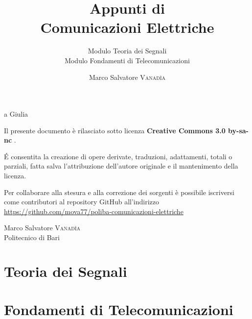 \documentclass[10pt,a4paper,onecolumn,titlepage,twoside,openright,final]{book}
\title{Appunti di \\ Comunicazioni Elettriche}
\subtitle{Modulo Teoria dei Segnali\\Modulo Fondamenti di Telecomunicazioni}
\author{Marco Salvatore \textsc{Vanad\`{i}a}}
\begin{document}
\frontmatter
\maketitle
\newpage

\null{} 
\begin{flushright}a Giulia\end{flushright}
\null
\vfill
Il presente documento è rilasciato sotto licenza \ccLogo \textbf{Creative Commons 3.0 by-sa-nc} \ccbyncsa. 

\'{E} consentita la creazione di opere derivate, traduzioni, adattamenti, totali o parziali, fatta salva l'attribuzione dell'autore originale e il mantenimento della licenza. 

Per collaborare alla stesura e alla correzione dei sorgenti è possibile iscriversi come contributori al repository GitHub all'indirizzo \url{https://github.com/mova77/poliba-comunicazioni-elettriche}

Marco Salvatore \textsc{Vanadìa}\\Politecnico di Bari
\cleardoublepage\clearpage{\pagestyle{empty}\cleardoublepage}

\tableofcontents

\mainmatter
\part{Teoria dei Segnali}










\part{Fondamenti di Telecomunicazioni}








{}

{}
\printindex
{}
{}
\listoffigures
%
\end{document}
